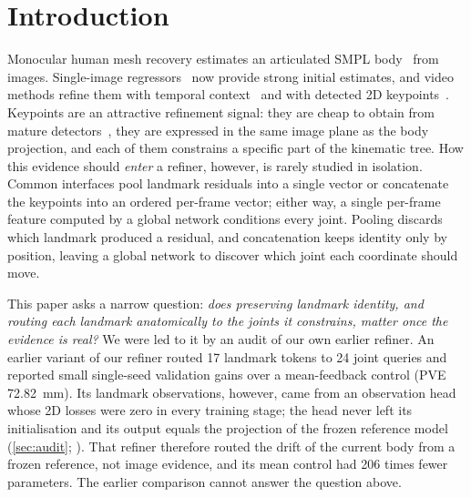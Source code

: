 \section{Introduction}
\label{sec:intro}

Monocular human mesh recovery estimates an articulated SMPL body~\cite{loper2015smpl} from images.
Single-image regressors~\cite{kanazawa2018hmr,kolotouros2019spin,goel2023hmr2} now provide strong initial estimates, and video methods refine them with temporal context~\cite{kocabas2020vibe,choi2021tcmr,shen2023glot} and with detected 2D keypoints~\cite{shin2024wham,shen2024gvhmr}.
Keypoints are an attractive refinement signal: they are cheap to obtain from mature detectors~\cite{cao2021openpose,xu2022vitpose}, they are expressed in the same image plane as the body projection, and each of them constrains a specific part of the kinematic tree.
How this evidence should \emph{enter} a refiner, however, is rarely studied in isolation.
Common interfaces pool landmark residuals into a single vector or concatenate the keypoints into an ordered per-frame vector; either way, a single per-frame feature computed by a global network conditions every joint.
Pooling discards which landmark produced a residual, and concatenation keeps identity only by position, leaving a global network to discover which joint each coordinate should move.

This paper asks a narrow question: \emph{does preserving landmark identity, and routing each landmark anatomically to the joints it constrains, matter once the evidence is real?}
We were led to it by an audit of our own earlier refiner.
An earlier variant of our refiner routed 17 landmark tokens to 24 joint queries and reported small single-seed validation gains over a mean-feedback control (PVE 72.82 \,mm).
Its landmark observations, however, came from an observation head whose 2D losses were zero in every training stage; the head never left its initialisation and its output equals the projection of the frozen reference model (\cref{sec:audit}; ).
That refiner therefore routed the drift of the current body from a frozen reference, not image evidence, and its mean control had 206 times fewer parameters.
The earlier comparison cannot answer the question above.

